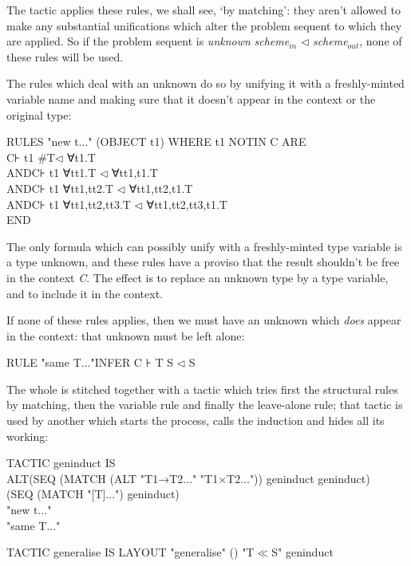 \documentclass[11pt]{book}
\newcommand{\tab}{\hspace{5mm}}
\begin{document}
The tactic applies these rules, we shall see, `by matching': they aren't allowed to make any substantial unifications which alter the problem sequent to which they are applied. So if the problem sequent is \textit{unknown} {\textbullet} \textit{scheme}$_{\textit{in}}$ $\triangleleft$ \textit{scheme}$_{\textit{out}}$, none of these rules will be used.


The rules which deal with an unknown do so by unifying it with a freshly-minted variable name and making sure that it doesn't appear in the context or the original type:

RULES "new t{\textbullet}..." (OBJECT t1) WHERE t1 NOTIN C ARE\\
\tab C⊦ t1 {\textbullet} \#T$\triangleleft$ ∀t1.T \\
AND\tab C⊦ t1 {\textbullet} ∀tt1.T $\triangleleft$ ∀tt1,t1.T \\
AND\tab C⊦ t1 {\textbullet} ∀tt1,tt2.T $\triangleleft$ ∀tt1,tt2,t1.T \\
AND\tab C⊦ t1 {\textbullet} ∀tt1,tt2,tt3.T $\triangleleft$ ∀tt1,tt2,tt3,t1.T \\
END


The only formula which can possibly unify with a freshly-minted type variable is a type unknown, and these rules have a proviso that the result shouldn't be free in the context \textit{C}. The effect is to replace an unknown type by a type variable, and to include it in the context.


If none of these rules applies, then we must have an unknown which \textit{does} appear in the context: that unknown must be left alone:

RULE "same T{\textbullet}..."\tab INFER C ⊦ T {\textbullet} S $\triangleleft$ S


The whole is stitched together with a tactic which tries first the structural rules by matching, then the variable rule and finally the leave-alone rule; that tactic is used by another which starts the process, calls the induction and hides all its working:

TACTIC geninduct IS \\
\tab ALT\tab (SEQ (MATCH (ALT "T1→T2{\textbullet}..." "T1$\times$T2{\textbullet}...")) geninduct geninduct) \\
\tab \tab (SEQ (MATCH "[T]{\textbullet}...") geninduct)\\
\tab \tab "new t{\textbullet}..."\\
\tab \tab "same T{\textbullet}..."

TACTIC generalise IS LAYOUT "generalise" () "T$\ll$S" geninduct
\end{document}
